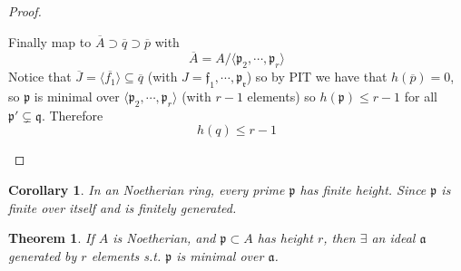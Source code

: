 \documentclass[11pt,a4paper]{article}
\theoremstyle{definition}
\theoremstyle{plain}
\newtheorem{theorem}[definition]{Theorem}
\newtheorem{corollary}[definition]{Corollary}
\theoremstyle{remark}
\newcommand{\angles}[1]{\langle #1 \rangle}
\begin{document}
\begin{proof}
\begin{itemize}
        Finally map to $\overline{A} \supset \overline{q} \supset \overline{p}$ with 
        $$\overline{A} = A/\angles{\mathfrak{p}_2, \cdots, \mathfrak{p}_r}$$
        Notice that $\overline{J} = \angles{\overline{f_1}} \subseteq \overline{q}$ (with $J = \mathfrak{f_1, \cdots, p_r}$) so by PIT we have that 
        $h(\overline{p}) = 0$, so $\mathfrak{p}$ is  minimal over $\angles{\mathfrak{p}_2, \cdots, \mathfrak{p}_r}$ (with $r-1$ elements) so 
        $h(\mathfrak{p}) \le r-1$ for all $\mathfrak{p}' \subsetneq \mathfrak{q}$. Therefore 
        $$h(q) \le r-1$$
    \end{itemize}
\end{proof}

\begin{corollary}
    In an Noetherian ring, every prime $\mathfrak{p}$ has finite height. Since $\mathfrak{p}$ is finite over itself and is finitely generated.
\end{corollary}

\begin{theorem}
    If $A$ is Noetherian, and $\mathfrak{p} \subset A$ has height $r$, then $\exists$ an ideal $\mathfrak{a}$ generated by $r$ elements s.t. 
    $\mathfrak{p}$ is minimal over $\mathfrak{a}$.
\end{theorem}
\end{document}
